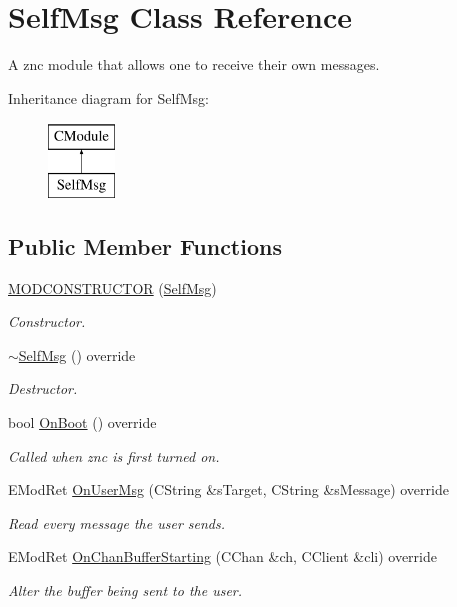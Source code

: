 \hypertarget{class_self_msg}{}\section{Self\+Msg Class Reference}
\label{class_self_msg}


A znc module that allows one to receive their own messages.  


Inheritance diagram for Self\+Msg\+:\begin{figure}[H]
\begin{center}
\leavevmode
\includegraphics[height=2.000000cm]{class_self_msg}
\end{center}
\end{figure}
\subsection*{Public Member Functions}
\begin{DoxyCompactItemize}
\item 
\hyperlink{class_self_msg_a7eb533ec01cd81c8907fcf3a0ebd078e}{M\+O\+D\+C\+O\+N\+S\+T\+R\+U\+C\+T\+OR} (\hyperlink{class_self_msg}{Self\+Msg})
\begin{DoxyCompactList}\small\item\em Constructor. \end{DoxyCompactList}\item 
\hyperlink{class_self_msg_a7febe41f96890d89051a91840da84fab}{$\sim$\+Self\+Msg} () override
\begin{DoxyCompactList}\small\item\em Destructor. \end{DoxyCompactList}\item 
bool \hyperlink{class_self_msg_a59bd01047737a3b30ae430fc3612653d}{On\+Boot} () override
\begin{DoxyCompactList}\small\item\em Called when znc is first turned on. \end{DoxyCompactList}\item 
E\+Mod\+Ret \hyperlink{class_self_msg_ae86a578c56e20230f89d776e02b089d5}{On\+User\+Msg} (C\+String \&s\+Target, C\+String \&s\+Message) override
\begin{DoxyCompactList}\small\item\em Read every message the user sends. \end{DoxyCompactList}\item 
E\+Mod\+Ret \hyperlink{class_self_msg_a8c7c5d393c196048cd51b63bc8ba59b1}{On\+Chan\+Buffer\+Starting} (C\+Chan \&ch, C\+Client \&cli) override
\begin{DoxyCompactList}\small\item\em Alter the buffer being sent to the user. \end{DoxyCompactList}\end{DoxyCompactItemize}
